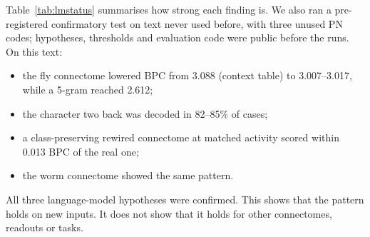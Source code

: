 \documentclass[conference]{IEEEtran}
\begin{document}
Table~\ref{tab:lmstatus} summarises how strong each finding is. We also ran a
pre-registered confirmatory test on text never used before, with three unused
PN codes; hypotheses, thresholds and evaluation code were public before the
runs. On this text:
\begin{itemize}
\item the fly connectome lowered BPC from 3.088 (context table) to 3.007--3.017,
while a 5-gram reached 2.612;
\item the character two back was decoded in 82--85\% of cases;
\item a class-preserving rewired connectome at matched activity scored within
0.013 BPC of the real one;
\item the worm connectome showed the same pattern.
\end{itemize}
All three language-model hypotheses were confirmed. This shows that the
pattern holds on new inputs. It does not show that it holds for other
connectomes, readouts or tasks.
\end{document}
